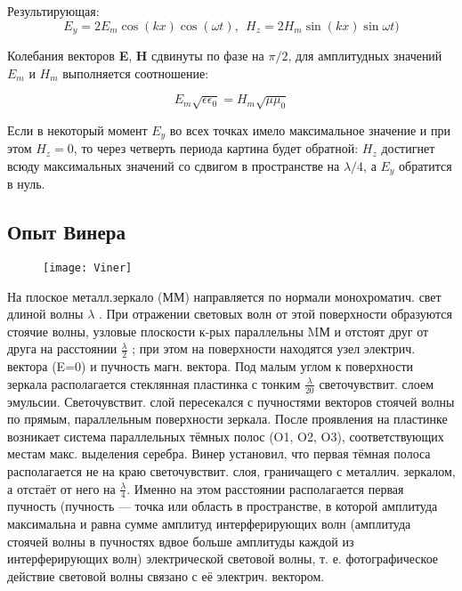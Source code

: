 Результирующая:
$$E_y = 2E_m \cos{(kx)}\cos{(\omega t)}, \ \ H_z = 2H_m \sin{(kx)}\sin{\omega t)}$$

Колебания векторов \textbf{E}, \textbf{H} сдвинуты по фазе на $\pi/2$, для амплитудных значений $E_m$ и $H_m$ выполняется соотношение:

$$E_m \sqrt{\epsilon \epsilon_0} = H_m \sqrt{\mu \mu_0}$$

Если в некоторый момент $ E_y$ во всех точках имело максимальное значение и при этом $ H_z =0$, то через четверть периода картина будет обратной: $ H_z$ достигнет всюду максимальных значений со сдвигом в пространстве на $ \lambda/4$, а $ E_y$ обратится в нуль. 
\\ 

\subsection{Опыт Винера}


\begin{figure}[H]
	\centering
	\texttt{[image: Viner]}
\end{figure}

На плоское металл.зеркало (ММ)  направляется по нормали монохроматич. свет длиной волны  $\lambda$ . При отражении световых волн от этой поверхности образуются стоячие волны, узловые плоскости к-рых параллельны MМ и отстоят друг от друга на расстоянии $\frac{\lambda}{2}$ ; при этом на поверхности находятся узел электрич. вектора (E=0) и пучность магн. вектора. Под малым углом к поверхности зеркала располагается стеклянная пластинка с тонким $\frac{\lambda}{20}$  светочувствит. слоем эмульсии. Светочувствит. слой пересекался с пучностями векторов стоячей волны по прямым, параллельным поверхности зеркала. После  проявления на пластинке возникает система параллельных тёмных полос (O1, O2, O3), соответствующих местам макс. выделения серебра. Винер установил, что первая тёмная полоса располагается не на краю светочувствит. слоя, граничащего с металлич. зеркалом, а отстаёт от него на $\frac{\lambda}{4}$. Именно на этом расстоянии располагается первая пучность (пучность — точка или область в пространстве, в которой амплитуда максимальна и равна сумме амплитуд интерферирующих волн (амплитуда стоячей волны в пучностях вдвое больше амплитуды каждой из интерферирующих волн) электрической световой волны, т. е. фотографическое действие световой волны связано с её электрич. вектором.